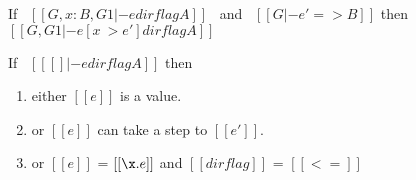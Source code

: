 \begin{lemma}[Substitution]
\label{lemma:union:substitution}
  If \ $[[G, x:B , G1 |- e dirflag A]]$ \ and \ $[[G |- e' => B]]$
  then \ $[[G, G1 |- e [ x ~> e' ] dirflag A]]$
\end{lemma}

\begin{lemma}[Progress]
\label{lemma:union:progress}
If \ $[[ [] |- e dirflag A]]$ then
 \begin{enumerate}
  \item either $[[e]]$ is a value.
  \item or $[[e]]$ can take a step to $[[e']]$.
  \item or $[[e]]$ = $[[\x.e]]$ and $[[dirflag]]$ = $[[<=]]$
  \end{enumerate}
\end{lemma}

\begin{comment}
\begin{proof}
By induction on typing relation.
  \begin{itemize}
    \item Cases \rref{typ-int, typ-var, typ-app, typ-sub, typ-abs} are trivial to prove.
    \item Case \rref{typ-anno} requires \cref{lemma:union:value-not-value}.
    \item Case \rref{typ-typeof} requires
    \cref{lemma:union:check-pexpr-ann,lemma:union:check-or-typ,lemma:union:pexpr-inf-typ}.
  \end{itemize}
\end{proof}

\begin{lemma}[Value Decidability]
\label{lemma:union:value-not-value}
$\forall$ $[[e]]$, \ value \ $[[e]]$ \ $\vee$ \ $\neg$ value \ $[[e]]$.
\end{lemma}

\begin{lemma}[check-or-typ]
\label{lemma:union:check-or-typ}
If \ $[[A *s B]]$ \ and \ $[[G |- p <= A \/ B]]$ \ then:
  \begin{enumerate}
    \item either \ $[[G |- p <= A]]$
    \item or \ $[[G |- p <= B]]$
  \end{enumerate}
\end{lemma}

\begin{lemma}[pexpr-inf-typ]
\label{lemma:union:pexpr-inf-typ}
If \ $[[G |- p <= A]]$ \ then:
  \begin{enumerate}
  \item $\exists$ $[[B]]$, \ $[[B <: A]]$
  \item and \ $[[G |- p => B]]$
  \end{enumerate}
\end{lemma}
\end{comment}

